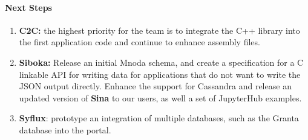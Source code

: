 \paragraph{Next Steps}
\begin{enumerate}
\item \textbf{C2C:} the highest priority for the team is to integrate the C++
	library into the first application code and continue to enhance 
	assembly files. 
\item \textbf{Siboka:} Release an initial Mnoda schema, and create a specification for a C linkable API for writing data for applications that do not want to write the JSON output directly. Enhance the support for Cassandra and release an updated version of \textbf{Sina} to our users, as well a set of JupyterHub examples.
\item \textbf{Syflux}: prototype an integration of multiple databases, such as
	the Granta database into the portal.

\end{enumerate}
